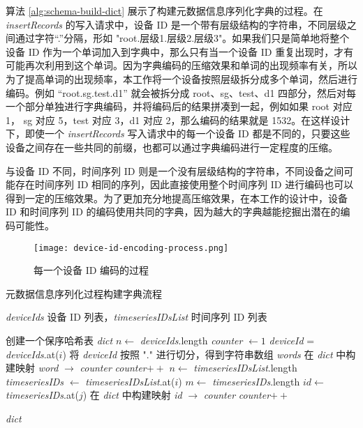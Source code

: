  算法 \ref{alg:schema-build-dict} 展示了构建元数据信息序列化字典的过程。在 \emph{insertRecords} 的写入请求中，设备 ID 是一个带有层级结构的字符串，不同层级之间通过字符“.”分隔，形如 "root.层级1.层级2.层级3"。如果我们只是简单地将整个设备 ID 作为一个单词加入到字典中，那么只有当一个设备 ID 重复出现时，才有可能再次利用到这个单词。因为字典编码的压缩效果和单词的出现频率有关，所以为了提高单词的出现频率，本工作将一个设备按照层级拆分成多个单词，然后进行编码。例如 “root.sg.test.d1” 就会被拆分成 root、sg、test、d1 四部分，然后对每一个部分单独进行字典编码，并将编码后的结果拼凑到一起，例如如果 root 对应 1， sg 对应 5，test 对应 3，d1 对应 2，那么编码的结果就是 1532。在这样设计下，即使一个 \emph{insertRecords} 写入请求中的每一个设备 ID 都是不同的，只要这些设备之间存在一些共同的前缀，也都可以通过字典编码进行一定程度的压缩。

与设备 ID 不同，时间序列 ID 则是一个没有层级结构的字符串，不同设备之间可能存在时间序列 ID 相同的序列，因此直接使用整个时间序列 ID 进行编码也可以得到一定的压缩效果。为了更加充分地提高压缩效果，在本工作的设计中，设备 ID 和时间序列 ID 的编码使用共同的字典，因为越大的字典越能挖掘出潜在的编码可能性。

\begin{figure}
  \centering
  \texttt{[image: device-id-encoding-process.png]}
  \caption{每一个设备 ID 编码的过程}
  \label{fig:device-id-encoding}
\end{figure}

\begin{algorithm}
  \caption{元数据信息序列化过程构建字典流程}
  \label{alg:schema-build-dict}
  \small
  \begin{algorithmic}
    \REQUIRE \emph{deviceIds} 设备 ID 列表，\emph{timeseriesIDsList} 时间序列 ID 列表

    \STATE 创建一个保序哈希表 \emph{dict}
    \STATE $n\leftarrow$ \emph{deviceIds}.length
    \STATE \emph{counter} $\leftarrow 1$
      \STATE \emph{deviceId} = \emph{deviceIds}.at($i$)
      \STATE 将 \emph{deviceId} 按照 "." 进行切分，得到字符串数组 \emph{words}
          \STATE 在 \emph{dict} 中构建映射 \emph{word} $\rightarrow$ \emph{counter}
          \STATE \emph{counter}$++$
        \ENDIF
      \ENDFOR
    \ENDFOR
    \STATE $n \leftarrow$ \emph{timeseriesIDsList}.length
      \STATE \emph{timeseriesIDs} $\leftarrow$ \emph{timeseriesIDsList}.at($i$)
      \STATE $m \leftarrow$ \emph{timeseriesIDs}.length
        \STATE $id \leftarrow$ \emph{timeseriesIDs}.at($j$)
          \STATE 在 \emph{dict} 中构建映射 \emph{id} $\rightarrow$ \emph{counter}
          \STATE \emph{counter}$++$
        \ENDIF
      \ENDFOR
    \ENDFOR

    \RETURN \emph{dict}

  \end{algorithmic}
\end{algorithm}

